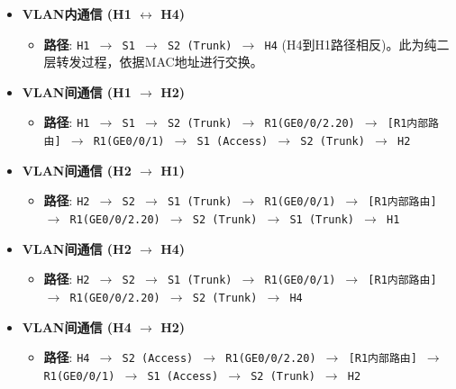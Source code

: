 \documentclass[12pt, a4paper]{article}
\begin{document}
\begin{itemize}
    \item \textbf{VLAN内通信 (H1 $\leftrightarrow$ H4)}
    \begin{itemize}
        \item \textbf{路径}: \texttt{H1 $\rightarrow$ S1 $\rightarrow$ S2 (Trunk) $\rightarrow$ H4} (H4到H1路径相反)。此为纯二层转发过程，依据MAC地址进行交换。
    \end{itemize}

    \item \textbf{VLAN间通信 (H1 $\rightarrow$ H2)}
    \begin{itemize}
        \item \textbf{路径}: \texttt{H1 $\rightarrow$ S1 $\rightarrow$ S2 (Trunk) $\rightarrow$ R1(GE0/0/2.20) $\rightarrow$ [R1内部路由] $\rightarrow$ R1(GE0/0/1) $\rightarrow$ S1 (Access) $\rightarrow$ S2 (Trunk) $\rightarrow$ H2}
    \end{itemize}

    \item \textbf{VLAN间通信 (H2 $\rightarrow$ H1)}
    \begin{itemize}
        \item \textbf{路径}: \texttt{H2 $\rightarrow$ S2 $\rightarrow$ S1 (Trunk) $\rightarrow$ R1(GE0/0/1) $\rightarrow$ [R1内部路由] $\rightarrow$ R1(GE0/0/2.20) $\rightarrow$ S2 (Trunk) $\rightarrow$ S1 (Trunk) $\rightarrow$ H1}
    \end{itemize}

    \item \textbf{VLAN间通信 (H2 $\rightarrow$ H4)}
    \begin{itemize}
        \item \textbf{路径}: \texttt{H2 $\rightarrow$ S2 $\rightarrow$ S1 (Trunk) $\rightarrow$ R1(GE0/0/1) $\rightarrow$ [R1内部路由] $\rightarrow$ R1(GE0/0/2.20) $\rightarrow$ S2 (Trunk) $\rightarrow$ H4}
    \end{itemize}

    \item \textbf{VLAN间通信 (H4 $\rightarrow$ H2)}
    \begin{itemize}
        \item \textbf{路径}: \texttt{H4 $\rightarrow$ S2 (Access) $\rightarrow$ R1(GE0/0/2.20) $\rightarrow$ [R1内部路由] $\rightarrow$ R1(GE0/0/1) $\rightarrow$ S1 (Access) $\rightarrow$ S2 (Trunk) $\rightarrow$ H2}
    \end{itemize}
\end{itemize}
\end{document}
